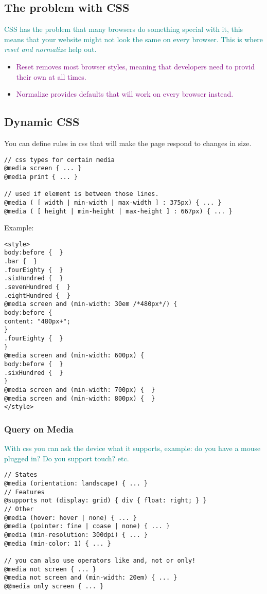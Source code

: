 \documentclass[main.tex,fontsize=8pt,paper=a4,paper=portrait,DIV=calc,]{scrartcl}
\begin{document}
\subsection{The problem with CSS}
\textcolor{teal}{CSS has the problem that many browsers do something special with it, this means that your website might not look the same on every browser.\newline
This is where \emph{reset and normalize} help out.}
\begin{itemize}
\item \textcolor{purple}{Reset removes most browser styles, meaning that developers need to provid their own at all times.}
\item \textcolor{purple}{Normalize provides defaults that will work on every browser instead.}
\end{itemize} 

\subsection{Dynamic CSS}
You can define rules in css that will make the page respond to changes in size.
\begin{lstlisting}
// css types for certain media
@media screen { ... }
@media print { ... }

// used if element is between those lines.
@media ( [ width | min-width | max-width ] : 375px) { ... }
@media ( [ height | min-height | max-height ] : 667px) { ... }
\end{lstlisting}
Example:
\begin{lstlisting}
<style>
body:before {  }
.bar {  }
.fourEighty {  }
.sixHundred {  }
.sevenHundred {  }
.eightHundred {  }
@media screen and (min-width: 30em /*480px*/) {
body:before {
content: "480px+";
}
.fourEighty {  }
}
@media screen and (min-width: 600px) {
body:before {  }
.sixHundred {  }
}
@media screen and (min-width: 700px) {  }
@media screen and (min-width: 800px) {  }
</style>
\end{lstlisting}

\subsubsection{Query on Media}
\textcolor{teal}{With css you can ask the device what it supports, example: do you have a mouse plugged in? Do you support touch? etc.} 
\begin{lstlisting}
// States
@media (orientation: landscape) { ... }
// Features
@supports not (display: grid) { div { float: right; } }
// Other
@media (hover: hover | none) { ... }
@media (pointer: fine | coase | none) { ... }
@media (min-resolution: 300dpi) { ... }
@media (min-color: 1) { ... }

// you can also use operators like and, not or only!
@media not screen { ... }
@media not screen and (min-width: 20em) { ... }
@@media only screen { ... }
\end{lstlisting}
\end{document}

